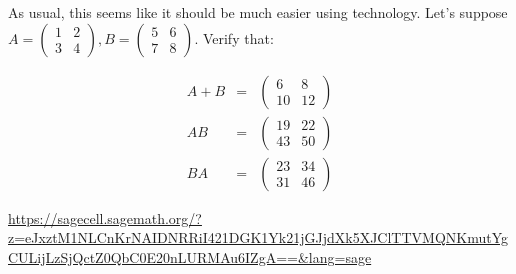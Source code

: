 As usual, this seems like it should be much easier using technology.  Let's suppose $A=\begin{pmatrix} 1 & 2 \\ 3 & 4\end{pmatrix}, B=\begin{pmatrix} 5 & 6 \\ 7 & 8\end{pmatrix}$.  Verify that:

\begin{eqnarray*}
A+B&=&\begin{pmatrix} 6 & 8 \\ 10 & 12\end{pmatrix}\\
AB&=&\begin{pmatrix} 19 & 22 \\ 43 & 50\end{pmatrix}\\
BA&=&\begin{pmatrix} 23 & 34 \\ 31 & 46\end{pmatrix}
\end{eqnarray*}


\url{https://sagecell.sagemath.org/?z=eJxztM1NLCnKrNAIDNRRiI421DGK1Yk21jGJjdXk5XJClTTVMQNKmutYgCULijLzSjQctZ0QbC0E20nLURMAu6IZgA==&lang=sage}

